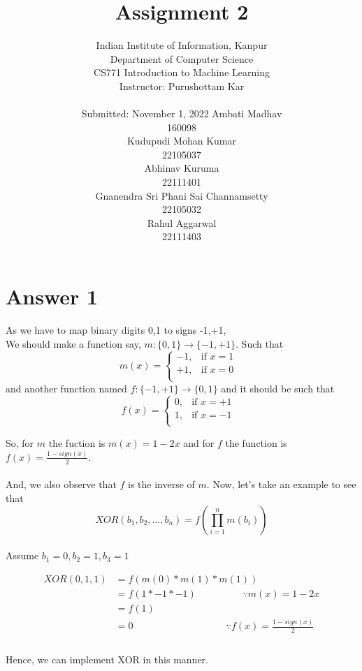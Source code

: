 \documentclass{article}
\title{Assignment 2}
\author{%
  Indian Institute of Information, Kanpur\\
  Department of Computer Science\\
  CS771 Introduction to Machine Learning\\
  Instructor: Purushottam Kar \\\\ 
  Submitted: November 1, 2022
  \AND
  Ambati Madhav  \\
 160098\\
  \And
  Kudupudi Mohan Kumar \\
  22105037 \\
   \And
  Abhinav Kuruma \\
  22111401 \\
 \AND
  Gnanendra Sri Phani Sai Channamsetty \\
  22105032 \\
  \And
  Rahul Aggarwal\\
 22111403\\
}
\begin{document}
\maketitle


\newpage
\tableofcontents
\newpage
\section{Answer 1}
As we have to map binary digits 0,1 to signs -1,+1,\\
We should make a function say, $m:\{0,1\} \to \{-1,+1\}$. Such that \\
$$
m(x)=\begin{cases}
			-1, & \text{if $x=1$ }\\
            +1, & \text{if $x=0$}\\
	   \end{cases}
$$
and another function named $f:\{-1,+1\} \to \{0,1\}$ and it should be such that \\
$$
f(x)=\begin{cases}
			0, & \text{if $x=+1$ }\\
            1, & \text{if $x=-1$}\\
		 \end{cases}
$$

So, for $m$ the fuction is $m(x) =1 -2x$ and for $f$ the function is $f(x) = \frac{1-sign(x)}{2}$.\\\\
And, we also observe that $f$ is the inverse of $m$. Now, let's take an example to see that
\begin{equation}
XOR(b_1,b_2, \dots ,b_n) = f\left( \prod_{i=1}^n m(b_i) \right)
\end{equation}
\\
Assume $b_1=0,b_2=1,b_3=1$

\begin{equation} \label{eq1}
\begin{split}
XOR(0,1,1) & = f( m(0) * m(1) * m(1) )\\
& = f(1*-1*-1) \hspace{2cm} \text{$\because$} m(x) = 1-2x\\
& = f(1)\\
& = 0  \hspace{4cm} \text {$\because$} f(x) = \frac{1-sign(x)}{2}\\
\end{split}
\end{equation}
\\
Hence, we can implement XOR in this manner.
\end{document}
